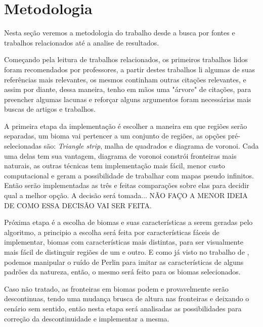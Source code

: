 \chapter{Metodologia}
Nesta seção veremos a metodologia do trabalho desde a busca por fontes e trabalhos
relacionados até a analise de resultados.

Começando pela leitura de trabalhos relacionados, os primeiros trabalhos lidos
foram recomendados por professores, a partir destes trabalhos li algumas de suas
referências mais relevantes, os mesmos continham outras citações relevantes, e
assim por diante, dessa maneira, tenho em mãos uma "árvore" de citações,
para preencher algumas lacunas e reforçar alguns argumentos foram necessárias
mais buscas de artigos e trabalhos.

A primeira etapa da implementação é escolher a maneira em que regiões serão
separadas, um bioma vai pertencer a um conjunto de regiões, as opções
pré-selecionadas são: \textit{Triangle strip}, malha de quadrados e diagrama de
voronoi. Cada uma delas tem sua vantagem, diagrama de voronoi constrói fronteiras
mais naturais, as outras técnicas tem implementação mais fácil, menor custo
computacional e geram a possibilidade de trabalhar com mapas pseudo infinitos.
Então serão implementadas as três e feitas comparações sobre elas para decidir
qual a melhor opção. A decisão será tomada...
NÃO FAÇO A MENOR IDEIA DE COMO ESSA DECISÃO VAI SER FEITA.

Próxima etapa é a escolha de biomas e suas características a serem geradas pelo%
algoritmo, a principio a escolha será feita por características fáceis de
implementar, biomas com características mais distintas, para ser visualmente
mais fácil de distinguir regiões de um e outro.%
E como já visto no trabalho de \cite{carli2012canion}, podemos manipular o ruído
de Perlin para imitar as características de alguns padrões da natureza, então, 
o mesmo será feito para os biomas selecionados.

Caso não tratado, as fronteiras em biomas podem e provavelmente serão
descontinuas, tendo uma mudança brusca de altura nas fronteiras e deixando o
cenário sem sentido, então nesta etapa será analisadas as possibilidades para
correção da descontinuidade e implementar a mesma.

